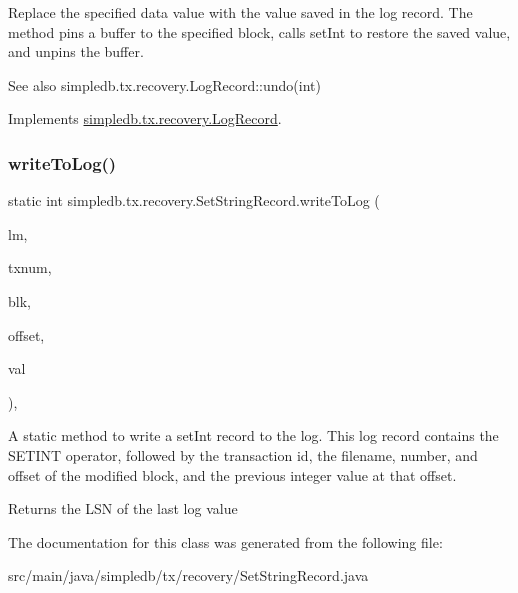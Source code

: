 Replace the specified data value with the value saved in the log record. The method pins a buffer to the specified block, calls set\+Int to restore the saved value, and unpins the buffer. \begin{DoxySeeAlso}{See also}
simpledb.\+tx.\+recovery.\+Log\+Record\+::undo(int) 
\end{DoxySeeAlso}


Implements \hyperlink{interfacesimpledb_1_1tx_1_1recovery_1_1LogRecord_a1f1949e7f3746b9b8b3bc985c89214e5}{simpledb.\+tx.\+recovery.\+Log\+Record}.

\mbox{\label{classsimpledb_1_1tx_1_1recovery_1_1SetStringRecord_a47c5a58fa49e28c24f8111983ab2fc85}} 
\subsubsection{\texorpdfstring{write\+To\+Log()}{writeToLog()}}
{\footnotesize\ttfamily static int simpledb.\+tx.\+recovery.\+Set\+String\+Record.\+write\+To\+Log (\begin{DoxyParamCaption}\item[{\hyperlink{classsimpledb_1_1log_1_1LogMgr}{Log\+Mgr}}]{lm,  }\item[{int}]{txnum,  }\item[{\hyperlink{classsimpledb_1_1file_1_1BlockId}{Block\+Id}}]{blk,  }\item[{int}]{offset,  }\item[{String}]{val }\end{DoxyParamCaption})\hspace{0.3cm}{\ttfamily [inline]}, {\ttfamily [static]}}

A static method to write a set\+Int record to the log. This log record contains the S\+E\+T\+I\+NT operator, followed by the transaction id, the filename, number, and offset of the modified block, and the previous integer value at that offset. \begin{DoxyReturn}{Returns}
the L\+SN of the last log value 
\end{DoxyReturn}


The documentation for this class was generated from the following file\+:\begin{DoxyCompactItemize}
\item 
src/main/java/simpledb/tx/recovery/Set\+String\+Record.\+java\end{DoxyCompactItemize}
